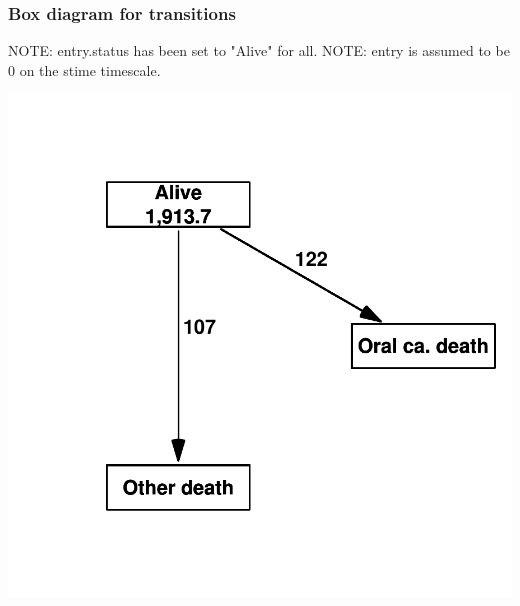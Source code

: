 \documentclass[handout,12pt,dvipsnames,t]{beamer}
\begin{document}
\begin{frame}[fragile]
\frametitle{Box diagram for transitions}


{\scriptsize 
\begin{Schunk}
\begin{Soutput}
NOTE: entry.status has been set to "Alive" for all.
NOTE: entry is assumed to be 0 on the stime timescale.
\end{Soutput}
\end{Schunk}
\includegraphics{Survival_competing_risk-boxplot}


}

\end{frame}
\end{document}
